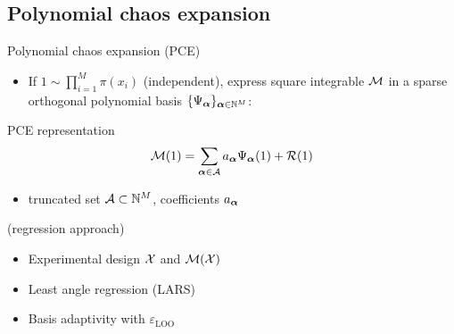 \documentclass{rsuqbeamernew}
\newcommand{\BParams}{1}
\begin{document}
\subsection{Polynomial chaos expansion}
\begin{frame}[t]{Polynomial chaos expansion (PCE)}
	\small
	\begin{itemize}
		\item[] If $\BParams\sim\prod_{i=1}^M\pi(x_i)$ ({\altx independent}), 
		express square integrable ${\mathcal M}$ in a {\altx sparse} orthogonal 
		{\altx polynomial 
		basis} 
		$\{\Psi_{\boldsymbol{\alpha}}\}_{\boldsymbol{\alpha}\in\mathbb{N}^M}$:
	\end{itemize}
	
	\begin{block}{PCE representation \hfill
			}
		\begin{equation*}
		\cm(\BParams) =
		\sum_{\ve{\alpha}\in\ca}a_{\ve{\alpha}}\Psi_{\ve{\alpha}}(\BParams) + 
		\mathcal{R}(\BParams)
		\end{equation*}
		
		\begin{itemize}
			\itemsep0.5em
			\item[] truncated set ${\mathcal A}\subset\mathbb{N}^M$, coefficients 
			$a_{\boldsymbol{\alpha}}$ 
		\end{itemize}
	\end{block}
	
	 (regression approach)
	\begin{itemize}
		\itemsep0.5em
		\item {\altx Experimental design} ${\mathcal X}$ and ${\mathcal M}({\mathcal X})$
		\item Least angle regression ({\altx LARS})
		\item Basis {\altx adaptivity} with $\varepsilon_{\mathrm{LOO}}$\hfill
	\end{itemize}
	\pause
	\vspace{1em}
\end{frame}

\end{document}

